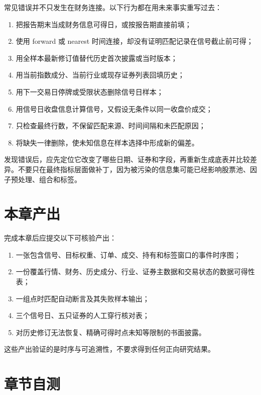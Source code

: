 \begin{warningbox}
常见错误并不只发生在财务连接。以下行为都在用未来事实重写过去：
\begin{enumerate}
  \item 把报告期末当成财务信息可得日，或按报告期直接前填；
  \item 使用 forward 或 nearest 时间连接，却没有证明匹配记录在信号截止前可得；
  \item 用全样本最新修订值替代历史首次披露或当时版本；
  \item 用当前指数成分、当前行业或现存证券列表回填历史；
  \item 用下一交易日停牌或受限状态删除信号日样本；
  \item 用信号日收盘信息计算信号，又假设无条件以同一收盘价成交；
  \item 只检查最终行数，不保留匹配来源、时间间隔和未匹配原因；
  \item 将缺失一律删除，使未知信息在样本选择中形成新的偏差。
\end{enumerate}
\end{warningbox}

发现错误后，应先定位它改变了哪些日期、证券和字段，再重新生成底表并比较差异。不要只在最终指标层面做补丁，因为被污染的信息集可能已经影响股票池、因子预处理、组合和标签。

\section{本章产出}

\begin{outputbox}
完成本章后应提交以下可核验产出：
\begin{enumerate}
  \item 一张包含信号、目标权重、订单、成交、持有和标签窗口的事件时序图；
  \item 一份覆盖行情、财务、历史成分、行业、证券主数据和交易状态的数据可得性表；
  \item 一组点时匹配自动断言及其失败样本输出；
  \item 三个信号日、五只证券的人工穿行核对表；
  \item 对历史修订无法恢复、精确可得时点未知等限制的书面披露。
\end{enumerate}
这些产出验证的是时序与可追溯性，不要求得到任何正向研究结果。
\end{outputbox}

\section{章节自测}

